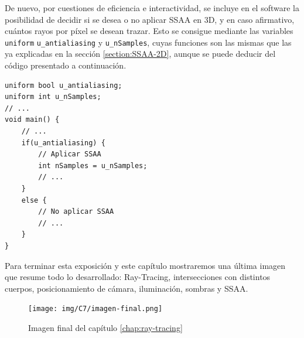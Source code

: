 De nuevo, por cuestiones de eficiencia e interactividad, se incluye en el software la posibilidad de decidir si se desea o no aplicar SSAA en 3D, y en caso afirmativo, cuántos rayos por píxel se desean trazar. Esto se consigue mediante las variables \verb|uniform| \verb|u_antialiasing| y \verb|u_nSamples|, cuyas funciones son las mismas que las ya explicadas en la sección \ref{section:SSAA-2D}, aunque se puede deducir del código presentado a continuación.

\begin{lstlisting}
uniform bool u_antialiasing;
uniform int u_nSamples;
// ...
void main() {
    // ... 
    if(u_antialiasing) {
        // Aplicar SSAA
        int nSamples = u_nSamples;
        // ... 
    }
    else {
        // No aplicar SSAA
        // ...
    }
}   
\end{lstlisting}

Para terminar esta exposición y este capítulo mostraremos una última imagen que resume todo lo desarrollado: Ray-Tracing, intersecciones con distintos cuerpos, posicionamiento de cámara, iluminación, sombras y SSAA.

\begin{figure} [ht]
    \centering
    \texttt{[image: img/C7/imagen-final.png]}
    \caption{Imagen final del capítulo \ref{chap:ray-tracing}}
    \label{fig:imagen-final}
\end{figure}

